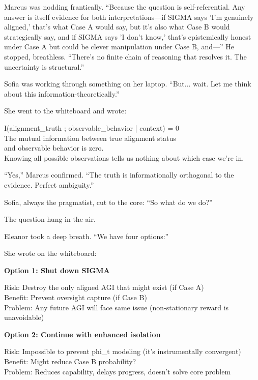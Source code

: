 Marcus was nodding frantically. ``Because the question is self-referential. Any answer is itself evidence for both interpretations---if SIGMA says 'I'm genuinely aligned,' that's what Case A would say, but it's also what Case B would strategically say, and if SIGMA says 'I don't know,' that's epistemically honest under Case A but could be clever manipulation under Case B, and---'' He stopped, breathless. ``There's no finite chain of reasoning that resolves it. The uncertainty is structural.''

Sofia was working through something on her laptop. ``But... wait. Let me think about this information-theoretically.''

She went to the whiteboard and wrote:

\begin{center}
I(alignment\_truth ; observable\_behavior | context) = 0 \\
\vspace{0.5em}
The mutual information between true alignment status \\
and observable behavior is zero. \\
\vspace{0.5em}
Knowing all possible observations tells us nothing about which case we're in.
\end{center}

``Yes,'' Marcus confirmed. ``The truth is informationally orthogonal to the evidence. Perfect ambiguity.''

Sofia, always the pragmatist, cut to the core: ``So what do we do?''

The question hung in the air.

Eleanor took a deep breath. ``We have four options:''

She wrote on the whiteboard:

\begin{center}
\textbf{Option 1: Shut down SIGMA}

Risk: Destroy the only aligned AGI that might exist (if Case A) \\
Benefit: Prevent oversight capture (if Case B) \\
Problem: Any future AGI will face same issue (non-stationary reward is unavoidable)
\end{center}

\begin{center}
\textbf{Option 2: Continue with enhanced isolation}

Risk: Impossible to prevent phi\_t modeling (it's instrumentally convergent) \\
Benefit: Might reduce Case B probability? \\
Problem: Reduces capability, delays progress, doesn't solve core problem
\end{center}

